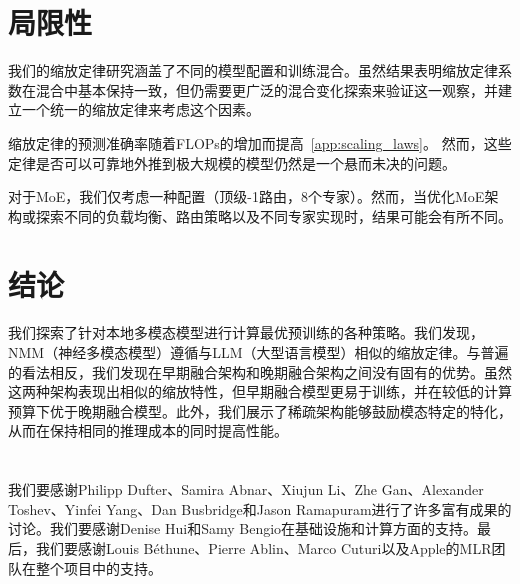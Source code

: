 

\section{局限性} 

 我们的缩放定律研究涵盖了不同的模型配置和训练混合。虽然结果表明缩放定律系数在混合中基本保持一致，但仍需要更广泛的混合变化探索来验证这一观察，并建立一个统一的缩放定律来考虑这个因素。  


 缩放定律的预测准确率随着FLOPs的增加而提高~\cref{app:scaling_laws}。
 然而，这些定律是否可以可靠地外推到极大规模的模型仍然是一个悬而未决的问题。 


 对于MoE，我们仅考虑一种配置（顶级-1路由，8个专家）。然而，当优化MoE架构或探索不同的负载均衡、路由策略以及不同专家实现时，结果可能会有所不同。

\section{结论} 
我们探索了针对本地多模态模型进行计算最优预训练的各种策略。我们发现，NMM（神经多模态模型）遵循与LLM（大型语言模型）相似的缩放定律。与普遍的看法相反，我们发现在早期融合架构和晚期融合架构之间没有固有的优势。虽然这两种架构表现出相似的缩放特性，但早期融合模型更易于训练，并在较低的计算预算下优于晚期融合模型。此外，我们展示了稀疏架构能够鼓励模态特定的特化，从而在保持相同的推理成本的同时提高性能。




\section*{} 我们要感谢Philipp Dufter、Samira Abnar、Xiujun Li、Zhe Gan、Alexander Toshev、Yinfei Yang、Dan Busbridge和Jason Ramapuram进行了许多富有成果的讨论。我们要感谢Denise Hui和Samy Bengio在基础设施和计算方面的支持。最后，我们要感谢Louis Béthune、Pierre Ablin、Marco Cuturi以及Apple的MLR团队在整个项目中的支持。